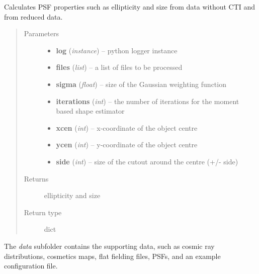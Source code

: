 \documentclass[a4paper,12pt,english]{sphinxmanual}
\begin{document}
\begin{fulllineitems}
\label{analysis:analysis.testCTIcorrection.testCTIcorrection}
Calculates PSF properties such as ellipticity and size from data without CTI and from
reduced data.
\begin{quote}\begin{description}
\item[{Parameters}] \leavevmode\begin{itemize}
\item {} 
\textbf{log} (\emph{instance}) -- python logger instance

\item {} 
\textbf{files} (\emph{list}) -- a list of files to be processed

\item {} 
\textbf{sigma} (\emph{float}) -- size of the Gaussian weighting function

\item {} 
\textbf{iterations} (\emph{int}) -- the number of iterations for the moment based shape estimator

\item {} 
\textbf{xcen} (\emph{int}) -- x-coordinate of the object centre

\item {} 
\textbf{ycen} (\emph{int}) -- y-coordinate of the object centre

\item {} 
\textbf{side} (\emph{int}) -- size of the cutout around the centre (+/- side)

\end{itemize}

\item[{Returns}] \leavevmode
ellipticity and size

\item[{Return type}] \leavevmode
dict

\end{description}\end{quote}

\end{fulllineitems}


The \emph{data} subfolder contains the supporting data, such as cosmic ray distributions, cosmetics maps,
flat fielding files, PSFs, and an example configuration file.
\end{document}
